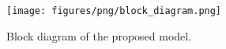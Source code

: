 \begin{figure}[t]
    \centering
    \texttt{[image: figures/png/block\_diagram.png]}
    \caption{Block diagram of the proposed model.}
    \label{fig:block diagram}
\end{figure}